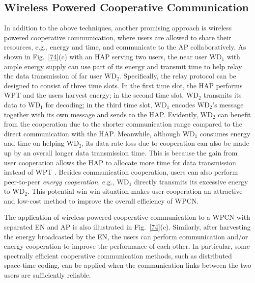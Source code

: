 \documentclass[journal, draftcls, one column, 12pt]{IEEEtran}
\begin{document}
\subsection{Wireless Powered Cooperative Communication}
In addition to the above techniques, another promising approach is wireless powered cooperative communication, where users are allowed to share their resources, e.g., energy and time, and communicate to the AP collaboratively. As shown in Fig.~\ref{74}(c) with an HAP serving two users, the near user WD$_1$ with ample energy supply can use part of its energy and transmit time to help relay the data transmission of far user WD$_2$. Specifically, the relay protocol can be designed to consist of three time slots. In the first time slot, the HAP performs WPT and the users harvest energy; in the second time slot, WD$_2$ transmits its data to WD$_1$ for decoding; in the third time slot, WD$_1$ encodes WD$_2$'s message together with its own message and sends to the HAP. Evidently, WD$_2$ can benefit from the cooperation due to the shorter communication range compared to the direct communication with the HAP. Meanwhile, although WD$_1$ consumes energy and time on helping WD$_2$, its data rate loss due to cooperation can also be made up by an overall longer data transmission time. This is because the gain from user cooperation allows the HAP to allocate more time for data transmission instead of WPT \cite{2014:Ju2}. Besides communication cooperation, users can also perform peer-to-peer \emph{energy cooperation}, e.g., WD$_1$ directly transmits its excessive energy to WD$_2$. This potential win-win situation makes user cooperation an attractive and low-cost method to improve the overall efficiency of WPCN.

The application of wireless powered cooperative communication to a WPCN with separated EN and AP is also illustrated in Fig.~\ref{74}(c). Similarly, after harvesting the energy broadcasted by the EN, the users can perform communication and/or energy cooperation to improve the performance of each other. In particular, some spectrally efficient cooperative communication methods, such as distributed space-time coding, can be applied when the communication links between the two users are sufficiently reliable.
\end{document}
